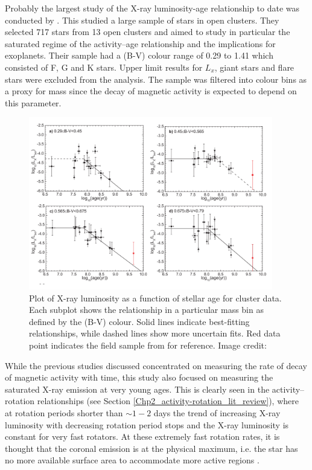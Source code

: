 Probably the largest study of the X-ray luminosity-age relationship to date was conducted by \citet{Jackson_etal_2012}. This studied a large sample of stars in open clusters. They selected 717 stars from 13 open clusters and aimed to study in particular the saturated regime of the activity--age relationship and the implications for exoplanets. Their sample had a (B-V) colour range of 0.29 to 1.41 which consisted of F, G and K stars. Upper limit results for $L_{x}$, giant stars and flare stars were excluded from the analysis. The sample was filtered into colour bins as a proxy for mass since the decay of magnetic activity is expected to depend on this parameter.

\begin{figure}[t]
    \centering
    \includegraphics[width=0.95\textwidth]{Figures/2-Historical_overview/jackson_etal_2012_part.pdf}
    \caption[\citet{Jackson_etal_2012} X-ray luminosity - age relationship for sample of clusters]{Plot of X-ray luminosity as a function of stellar age for cluster data. Each subplot shows the relationship in a particular mass bin as defined by the (B-V) colour. Solid lines indicate best-fitting relationships, while dashed lines show more uncertain fits. Red data point indicates the field sample from \citet{Pizzolato_etal_2003} for reference. Image credit: \citet{Jackson_etal_2012}}
    \label{fig:jackson_etal_2012_plot}
\end{figure}

While the previous studies discussed concentrated on measuring the rate of decay of magnetic activity with time, this study also focused on measuring the saturated X-ray emission at very young ages. This is clearly seen in the activity--rotation relationships (see Section \ref{Chp2_activity-rotation_lit_review}), where at rotation periods shorter than $\sim 1-2$ days the trend of increasing X-ray luminosity with decreasing rotation period stops and the X-ray luminosity is constant for very fast rotators. At these extremely fast rotation rates, it is thought that the coronal emission is at the physical maximum, i.e. the star has no more available surface area to accommodate more active regions \citep{Jardine_Unruh_1999}.

